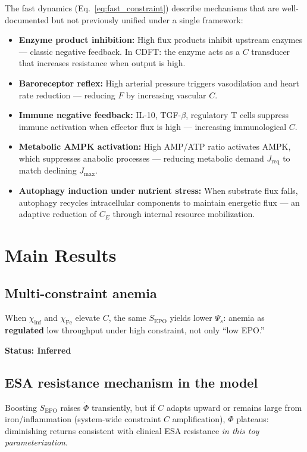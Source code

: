 \documentclass[11pt]{article}
\newcommand{\Jmax}{J_{\max}}
\newcommand{\Jreq}{J_{\mathrm{req}}}
\begin{document}
The fast dynamics (Eq.~\ref{eq:fast_constraint}) describe mechanisms that are well-documented but not previously unified under a single framework:
\begin{itemize}[leftmargin=1.5em,itemsep=3pt]
\item \textbf{Enzyme product inhibition:} High flux products inhibit upstream enzymes --- classic negative feedback. In CDFT: the enzyme acts as a $C$ transducer that increases resistance when output is high.
\item \textbf{Baroreceptor reflex:} High arterial pressure triggers vasodilation and heart rate reduction --- reducing $F$ by increasing vascular $C$.
\item \textbf{Immune negative feedback:} IL-10, TGF-$\beta$, regulatory T cells suppress immune activation when effector flux is high --- increasing immunological $C$.
\item \textbf{Metabolic AMPK activation:} High AMP/ATP ratio activates AMPK, which suppresses anabolic processes --- reducing metabolic demand $\Jreq$ to match declining $\Jmax$.
\item \textbf{Autophagy induction under nutrient stress:} When substrate flux falls, autophagy recycles intracellular components to maintain energetic flux --- an adaptive reduction of $C_E$ through internal resource mobilization.
\end{itemize}


\section{Main Results}

\subsection{Multi-constraint anemia}
When $\chi_{\mathrm{inf}}$ and $\chi_{\mathrm{Fe}}$ elevate $C$, the same $S_{\mathrm{EPO}}$ yields lower $\Psi_s$: anemia as \textbf{regulated} low throughput under high constraint, not only ``low EPO.''

\textbf{Status: Inferred}

\subsection{ESA resistance mechanism in the model}
Boosting $S_{\mathrm{EPO}}$ raises $\dot{\Phi}$ transiently, but if $C$ adapts upward or remains large from iron/inflammation (system-wide constraint $C$ amplification), $\Phi$ plateaus: diminishing returns consistent with clinical ESA resistance \emph{in this toy parameterization}.
\end{document}
